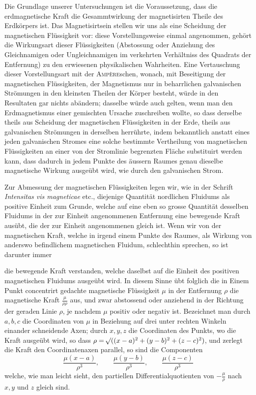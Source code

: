 Die Grundlage unserer Untersuchungen ist die Voraussetzung, dass die erdmagnetische Kraft die Gesammtwirkung der magnetisirten Theile des Erdkörpers ist. Das Magnetisirtsein stellen wir uns als eine Scheidung der magnetischen Flüssigkeit vor: diese Vorstellungsweise einmal angenommen, gehört die Wirkungsart dieser Flüssigkeiten (Abstossung oder Anziehung des Gleichnamigen oder Ungleichnamigen im verkehrten Verhältniss des Quadrats der Entfernung) zu den erwiesenen physikalischen Wahrheiten. Eine Vertauschung dieser Vorstellungsart mit der \textsc{Ampère}schen, wonach, mit Beseitigung der magnetischen Flüssigkeiten, der Magnetismus nur in beharrlichen galvanischen Strömungen in den kleinsten Theilen der Körper besteht, würde in den Resultaten gar nichts abändern; dasselbe würde auch gelten, wenn man den Erdmagnetismus einer gemischten Ursache zuschreiben wollte, so dass derselbe theils aus Scheidung der magnetischen Flüssigkeiten in der Erde, theils aus galvanischen Strömungen in derselben herrührte, indem bekanntlich anstatt eines jeden galvanischen Stromes eine solche bestimmte Vertheilung von magnetischen Flüssigkeiten an einer von der Stromlinie begrenzten Fläche substituirt werden kann, dass dadurch in jedem Punkte des äussern Raumes genau dieselbe magnetische Wirkung ausgeübt wird, wie durch den galvanischen Strom.

Zur Abmessung der magnetischen Flüssigkeiten legen wir, wie in der Schrift \textit{Intensitas vis magneticae} etc., diejenige Quantität nordlichen Fluidums als positive Einheit zum Grunde, welche auf eine eben so grosse Quantität desselben Fluidums in der zur Einheit angenommenen Entfernung eine bewegende Kraft ausübt, die der zur Einheit angenommenen gleich ist. Wenn wir von der magnetischen Kraft, welche in irgend einem Punkte des Raumes, als Wirkung von anderswo befindlichem magnetischen Fluidum, schlechthin sprechen, so ist darunter immer \par
\clearpage
{}
\noindent die bewegende Kraft verstanden, welche daselbst auf die Einheit des positiven magnetischen Fluidums ausgeübt wird. In diesem Sinne übt folglich die in Einem Punkt concentrirt gedachte magnetische Flüssigkeit $\mu$ in der Entfernung $\rho$ die magnetische Kraft $\frac{\mu}{\rho\rho}$ aus, und zwar abstossend oder anziehend in der Richtung der geraden Linie $\rho$, je nachdem $\mu$ positiv oder negativ ist. Bezeichnet man durch $a,b,c$ die Coordinaten von $\mu$ in Beziehung auf drei unter rechten Winkeln einander schneidende Axen; durch $x,y,z$ die Coordinaten des Punkts, wo die Kraft ausgeübt wird, so dass $\rho=\mathord{{}^{}\!\surd}((x-a)^2+(y-b)^2+(z-c)^2)$, und zerlegt die Kraft den Coordinatenaxen parallel, so sind die Componenten
\[
\frac{\mu(x-a)}{\rho^3},\qquad \frac{\mu(y-b)}{\rho^3},\qquad \frac{\mu(z-c)}{\rho^3}
\]
welche, wie man leicht sieht, den partiellen Differentialquotienten von $-\frac{\mu}{\rho}$ nach $x,y$ und $z$ gleich sind.


